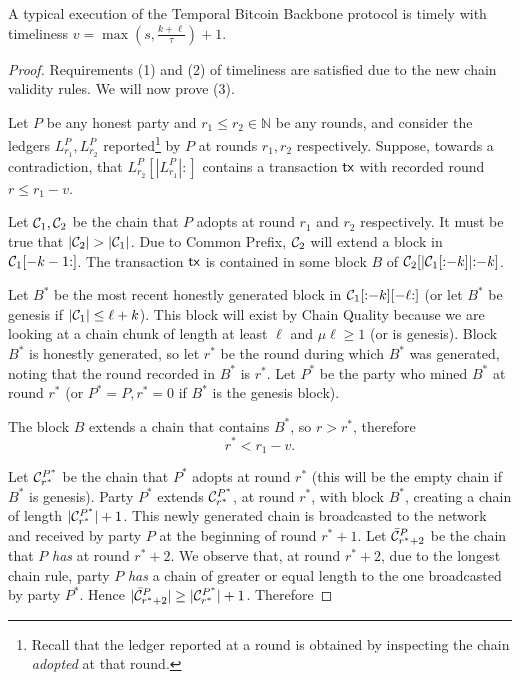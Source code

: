 \begin{theorem}
  A typical execution of the Temporal Bitcoin Backbone protocol is timely
  with timeliness $v = \max(s, \frac{k + \ell}{\tau}) + 1$.
\end{theorem}
\begin{proof}
  Requirements (1) and (2) of timeliness are satisfied due to the new chain validity rules.
  We will now prove (3).

  Let $P$ be any honest party and $r_1 \leq r_2 \in \mathbb{N}$ be any rounds, and consider
  the ledgers $L^P_{r_1}, L^P_{r_2}$ reported\footnote{
    Recall that the ledger reported at a round is obtained by inspecting the
    chain \emph{adopted} at that round.
  } by $P$ at rounds $r_1, r_2$ respectively.
  Suppose, towards a contradiction, that $L^P_{r_2}[|L^P_{r_1}|{:}]$ contains a transaction
  $\textsf{tx}$ with recorded round $r \leq r_1 - v$.

  Let $\mathcal{C}_1, \mathcal{C}_2$ be the chain that $P$ adopts at round $r_1$
  and $r_2$ respectively.
  It must be true that $|\mathcal{C}_2| > |\mathcal{C}_1|$.
  Due to Common Prefix, $\mathcal{C}_2$ will extend a block in $\mathcal{C}_1[-k-1{:}]$.
  The transaction $\textsf{tx}$ is contained in some block $B$ of $\mathcal{C}_2[|\mathcal{C}_1[{:}{-k}]|{:}{-k}]$.

  Let $B^*$ be the most recent
  honestly generated block in $\mathcal{C}_1[{:}{-k}][{-\ell}{:}]$
  (or let $B^*$ be genesis if $|\mathcal{C}_1| \leq \ell + k$).
  This block will exist by
  Chain Quality because we are looking at a chain chunk of length at least $\ell$ and
  $\mu\ell \geq 1$ (or is genesis).
  Block $B^*$ is honestly generated, so let $r^*$ be the round
  during which $B^*$ was generated, noting that the round recorded in $B^*$ is $r^*$.
  Let $P^*$ be the party who mined $B^*$ at round $r^*$ (or $P^* = P, r^* = 0$ if $B^*$ is
  the genesis block).

  The block $B$ extends a chain that contains $B^*$, so $r > r^*$,
  therefore
  \begin{equation}
    r^* < r_1 - v\label{eq:bitcoin-r-bound}.
  \end{equation}

  Let $\mathcal{C}^{P^*}_{r^*}$ be the chain that $P^*$ adopts at
  round $r^*$ (this will be the empty chain if $B^*$ is genesis).
  Party $P^*$ extends $\mathcal{C}^{P^*}_{r^*}$, at round $r^*$, with block $B^*$,
  creating a chain of length $|\mathcal{C}^{P^*}_{r^*}| + 1$.
  This newly generated chain is broadcasted to the network and
  received by party $P$ at the beginning of round $r^* + 1$.
  Let $\bar {\mathcal{C}}^P_{r^* + 2}$ be the chain
  that $P$ \emph{has} at round $r^* + 2$.
  We observe that, at round $r^* + 2$, due to the
  longest chain rule, party $P$ \emph{has} a chain of greater or equal
  length to the one broadcasted by party $P^*$. Hence
  $|\bar {\mathcal{C}}^P_{r^* + 2}| \geq |\mathcal{C}^{P^*}_{r^*}| + 1$. Therefore


\end{proof}
